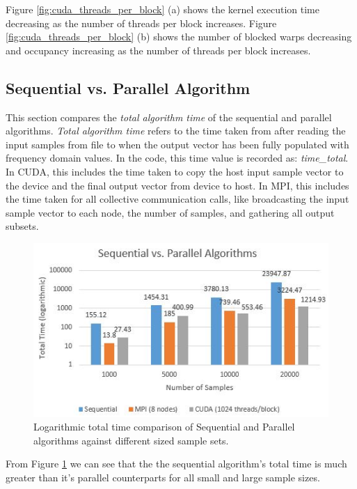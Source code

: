 \documentclass[11pt,a4paper]{article}
\begin{document}
Figure \ref{fig:cuda_threads_per_block} (a) shows the kernel execution time decreasing as the number of threads per block increases. Figure \ref{fig:cuda_threads_per_block} (b) shows the number of blocked warps decreasing and occupancy increasing as the number of threads per block increases.


\subsection{Sequential vs. Parallel Algorithm}\label{sect:seq_vs_par}
This section compares the \textit{total algorithm time} of the sequential and parallel algorithms. \textit{Total algorithm time} refers to the time taken from after reading the input samples from file to when the output vector has been fully populated with frequency domain values. In the code, this time value is recorded as: \textit{time\_total}. In CUDA, this includes the time taken to copy the host input sample vector to the device and the final output vector from device to host. In MPI, this includes the time taken for all collective communication calls, like broadcasting the input sample vector to each node, the number of samples, and gathering all output subsets.

\begin{figure}
\begin{center}
\includegraphics[scale=0.7]{seq_vs_par}
\end{center}
\caption{Logarithmic total time comparison of Sequential and Parallel algorithms against different sized sample sets.}
\label{fig:seq_vs_par}
\end{figure}

From Figure \ref{fig:seq_vs_par} we can see that the the sequential algorithm's total time is much greater than it's parallel counterparts for all small and large sample sizes.
\end{document}
